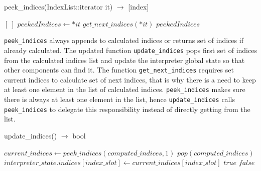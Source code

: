 \begin{algorithm}  {peek_indices(IndexList::iterator it) $\rightarrow$ [index]}
\singlespacing

\begin{algorithmic}[1]
    \State \Return $[\ ]$
  \Else
    \State $peekedIndices \gets *it$
      \State $get\_next\_indices(*it)$
    \EndIf
    \State \Return $peekedIndices$
  \EndIf
  \EndFunction
\end{algorithmic}
\end{algorithm}

\texttt{peek\_indices} always appends to calculated indices or returns set of indices
if already calculated. The updated function \texttt{update\_indices} pops first
set of indices from the calculated indices list and update the interpreter
global state so that other components can find it. The function
\texttt{get\_next\_indices} requires set current indices to calculate set of next
indices, that is why there is a need to keep at least one element in the list of
calculated indices. \texttt{peek\_indices} makes sure there is always at least one
element in the list, hence \texttt{update\_indices} calls \texttt{peek\_indices}
to delegate this responsibility instead of directly getting from the list.

\begin{algorithm}  {update\_indices() $\rightarrow$ bool}
\singlespacing

\begin{algorithmic}[1]
\State $current\_indices \gets peek\_indices(computed\_indices, 1)$
  \State $pop(computed\_indices)$
    \State $interpreter\_state.indices[index\_slot] \gets current\_indices[index\_slot]$
  \EndFor
  \State \Return $true$
\Else
  \State \Return $false$
\EndIf
\EndFunction
\end{algorithmic}
\end{algorithm}